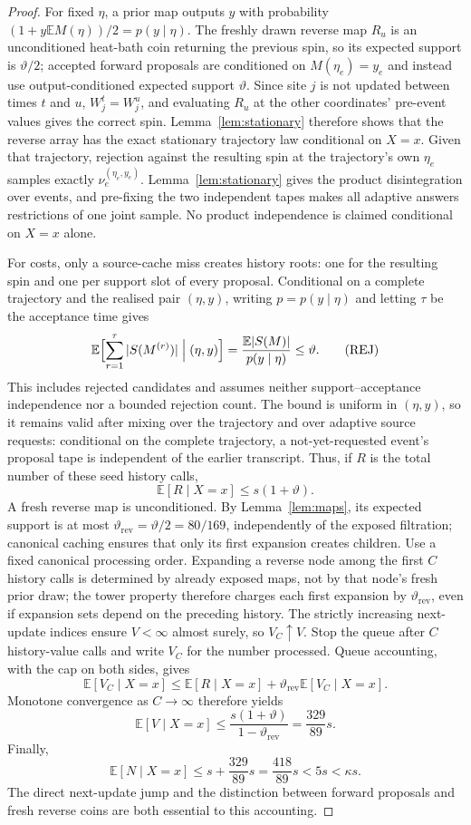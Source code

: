 \documentclass[11pt]{article}
\theoremstyle{definition}\newtheorem{definition}[theorem]{Definition}
\theoremstyle{remark}\newtheorem{remark}[theorem]{Remark}
\newcommand{\E}{\mathbb E}\newcommand{\Prb}{\mathbb P}
\begin{document}
\begin{proof}
For fixed \(\eta\), a prior map outputs \(y\) with probability \((1+y\E M(\eta))/2=p(y\mid\eta)\). The freshly drawn reverse map \(R_u\) is an unconditioned heat-bath coin returning the previous spin, so its expected support is \(\vartheta/2\); accepted forward proposals are conditioned on \(M(\eta_e)=y_e\) and instead use output-conditioned expected support \(\vartheta\). Since site \(j\) is not updated between times \(t\) and \(u\), \(W^t_j=W^u_j\), and evaluating \(R_u\) at the other coordinates' pre-event values gives the correct spin. Lemma~\ref{lem:stationary} therefore shows that the reverse array has the exact stationary trajectory law conditional on \(X=x\). Given that trajectory, rejection against the resulting spin at the trajectory's own \(\eta_e\) samples exactly \(\nu_e^{(\eta_e,y_e)}\). Lemma~\ref{lem:stationary} gives the product disintegration over events, and pre-fixing the two independent tapes makes all adaptive answers restrictions of one joint sample. No product independence is claimed conditional on \(X=x\) alone.

For costs, only a source-cache miss creates history roots: one for the resulting spin and one per support slot of every proposal. Conditional on a complete trajectory and the realised pair \((\eta,y)\), writing \(p=p(y\mid\eta)\) and letting \(\tau\) be the acceptance time gives
\[
 \E\Bigl[\sum_{r=1}^\tau|S(M^{(r)})|\Bigm|(\eta,y)\Bigr]=\frac{\E|S(M)|}{p(y\mid\eta)}\le\vartheta.
 \tag{REJ}
\]
This includes rejected candidates and assumes neither support--acceptance independence nor a bounded rejection count. The bound is uniform in \((\eta,y)\), so it remains valid after mixing over the trajectory and over adaptive source requests: conditional on the complete trajectory, a not-yet-requested event's proposal tape is independent of the earlier transcript. Thus, if \(R\) is the total number of these seed history calls,
\[
 \E[R\mid X=x]\le s(1+\vartheta).
\]
A fresh reverse map is unconditioned. By Lemma~\ref{lem:maps}, its expected support is at most \(\vartheta_{\mathrm{rev}}=\vartheta/2=80/169\), independently of the exposed filtration; canonical caching ensures that only its first expansion creates children. Use a fixed canonical processing order. Expanding a reverse node among the first \(C\) history calls is determined by already exposed maps, not by that node's fresh prior draw; the tower property therefore charges each first expansion by \(\vartheta_{\mathrm{rev}}\), even if expansion sets depend on the preceding history. The strictly increasing next-update indices ensure \(V<\infty\) almost surely, so \(V_C\uparrow V\). Stop the queue after \(C\) history-value calls and write \(V_C\) for the number processed. Queue accounting, with the cap on both sides, gives
\[
 \E[V_C\mid X=x]\le\E[R\mid X=x]+\vartheta_{\mathrm{rev}}\E[V_C\mid X=x].
\]
Monotone convergence as \(C\to\infty\) therefore yields
\[
 \E[V\mid X=x]\le\frac{s(1+\vartheta)}{1-\vartheta_{\mathrm{rev}}}=\frac{329}{89}s.
\]
Finally,
\[
 \E[N\mid X=x]\le s+\frac{329}{89}s=\frac{418}{89}s<5s<\kappa s.
\]
The direct next-update jump and the distinction between forward proposals and fresh reverse coins are both essential to this accounting.
\end{proof}
\end{document}
